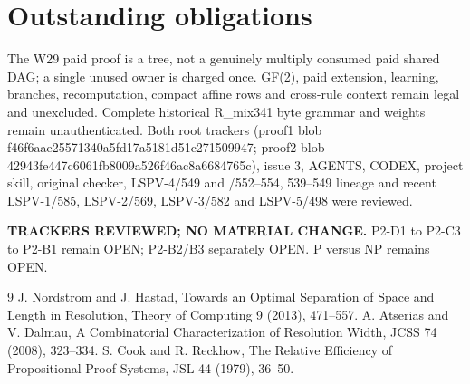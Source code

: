 \documentclass[11pt]{article}
\begin{document}
\section*{Outstanding obligations}
The W29 paid proof is a tree, not a genuinely multiply consumed paid shared DAG; a single unused owner is charged once. GF(2), paid extension, learning, branches, recomputation, compact affine rows and cross-rule context remain legal and unexcluded. Complete historical R_mix341 byte grammar and weights remain unauthenticated. Both root trackers (proof1 blob f46f6aae25571340a5fd17a5181d51c271509947; proof2 blob 42943fe447c6061fb8009a526f46ac8a6684765c), issue 3, AGENTS, CODEX, project skill, original checker, LSPV-4/549 and /552--554, 539--549 lineage and recent LSPV-1/585, LSPV-2/569, LSPV-3/582 and LSPV-5/498 were reviewed.
\par\noindent\textbf{TRACKERS REVIEWED; NO MATERIAL CHANGE.}
P2-D1 to P2-C3 to P2-B1 remain OPEN; P2-B2/B3 separately OPEN. P versus NP remains OPEN.

\begin{thebibliography}{9}
 J. Nordstrom and J. Hastad, Towards an Optimal Separation of Space and Length in Resolution, Theory of Computing 9 (2013), 471--557.
 A. Atserias and V. Dalmau, A Combinatorial Characterization of Resolution Width, JCSS 74 (2008), 323--334.
 S. Cook and R. Reckhow, The Relative Efficiency of Propositional Proof Systems, JSL 44 (1979), 36--50.
\end{thebibliography}
\end{document}
